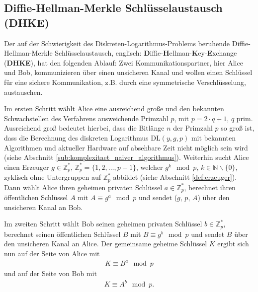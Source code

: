 \documentclass[
  a4paper,
  11pt,
]{scrartcl}
\theoremstyle{plain}
\theoremstyle{definition}
\theoremstyle{remark}
\newcommand{\N}{\mathbb{N}}
\newcommand{\Z}{\mathbb{Z}}
\begin{document}
\subsection{Diffie-Hellman-Merkle Schlüsselaustausch (DHKE)}
\label{sub:diffie_hellman_key_exchange}

Der auf der Schwierigkeit des Diskreten-Logarithmus-Problems beruhende Diffie-Hellman-Merkle Schlüsselaustausch, englisch: \textbf{D}iffie-\textbf{H}ellman-\textbf{K}ey-\textbf{E}xchange (\textbf{DHKE}), hat den folgenden Ablauf:
Zwei Kommunikationspartner, hier Alice und Bob, kommunizieren über einen unsicheren Kanal und wollen einen Schlüssel für eine sichere Kommunikation, z.B. durch eine symmetrische Verschlüsselung, austauschen.

Im ersten Schritt wählt Alice eine ausreichend große und den bekannten Schwachstellen des Verfahrens ausweichende Primzahl $p$, mit $p = 2 \cdot q + 1$, $q$ prim. Ausreichend groß bedeutet hierbei, dass die Bitlänge $n$ der Primzahl $p$ so groß ist, dass die Berechnung des diskreten Logarithmus $\text{DL}(y,g,p)$ mit bekannten Algorithmen und aktueller Hardware auf absehbare Zeit nicht möglich sein wird (siehe Abschnitt  \ref{sub:komplexitaet_naiver_algorithmus}). Weiterhin sucht Alice einen Erzeuger $g \in \Z_p^*$, $\Z_p^* = \{1, 2, \ldots, p-1\}$, welcher $g^k \mod p$, $k \in \N \backslash \{0\}$, zyklisch ohne Untergruppen auf $\Z_p^*$ abbildet (siehe Abschnitt  \ref{def:erzeuger}). Dann wählt Alice ihren geheimen privaten Schlüssel $a \in \Z_p^*$,  berechnet ihren öffentlichen Schlüssel $A$ mit $A \equiv g^a \mod p$ und sendet ($g$, $p$, $A$) über den unsicheren Kanal an Bob.

Im zweiten Schritt wählt Bob seinen geheimen privaten Schlüssel $b \in \Z_p^*$, berechnet seinen öffentlichen Schlüssel $B$ mit $B \equiv g^b \mod p$ und sendet $B$ über den unsicheren Kanal an Alice.
Der gemeinsame geheime Schlüssel $K$ ergibt sich nun auf der Seite von Alice mit
\begin{align*}
	K \equiv B^a \mod p
\end{align*}
und auf der Seite von Bob mit
\begin{align*}
	K \equiv A^b \mod p \text{.}
\end{align*}
\end{document}
